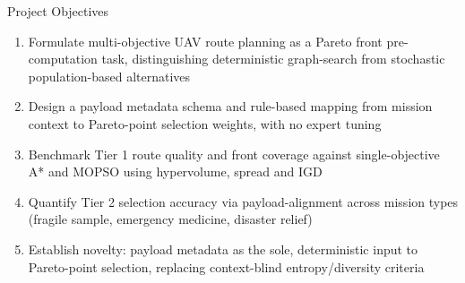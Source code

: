 \documentclass[aspectratio=169,11pt]{beamer}
\begin{document}
\begin{frame}{Project Objectives}
  \small
  \begin{enumerate}
    \setlength{\itemsep}{2mm}
    \item Formulate multi-objective UAV route planning as a Pareto front pre-computation task, distinguishing deterministic graph-search from stochastic population-based alternatives
    \item Design a payload metadata schema and rule-based mapping from mission context to Pareto-point selection weights, with no expert tuning
    \item Benchmark Tier 1 route quality and front coverage against single-objective A* and MOPSO using hypervolume, spread and IGD
    \item Quantify Tier 2 selection accuracy via payload-alignment across mission types (fragile sample, emergency medicine, disaster relief)
    \item Establish novelty: payload metadata as the sole, deterministic input to Pareto-point selection, replacing context-blind entropy/diversity criteria
  \end{enumerate}
\end{frame}
\end{document}
